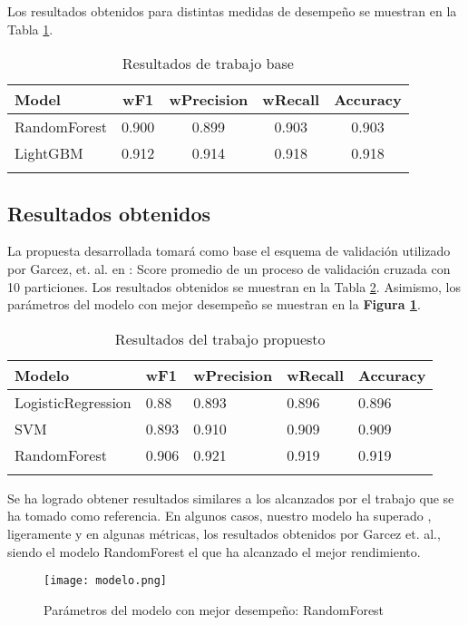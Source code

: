 \documentclass[conference]{IEEEtran}
\begin{document}
Los resultados obtenidos para distintas medidas de desempeño se muestran en la Tabla \ref{tab:base_performance}.

\begin{table}[h!]
\centering
\caption{Resultados de trabajo base}
\label{tab:base_performance}
\begin{tabular}{l|cccc}
\rule{0pt}{3ex}
Model & wF1 & wPrecision & wRecall & Accuracy \\
\hline
\rule{0pt}{3ex}
RandomForest & 0.900 & 0.899 & 0.903 & 0.903 \\
LightGBM & 0.912 & 0.914 & 0.918 & 0.918 \\
\rule{0pt}{3ex}
\end{tabular}
\end{table}

\subsection{\textbf{Resultados obtenidos}}
La propuesta desarrollada tomará como base el esquema de validación utilizado por Garcez, et. al. en \cite{bref}: Score promedio de un proceso de validación cruzada con 10 particiones. Los resultados obtenidos se muestran en la Tabla \ref{tab:resultados_modelos}. Asimismo, los parámetros del modelo con mejor desempeño se muestran en la \textbf{Figura \ref{modelo}}.

\begin{table}[h!]
\centering
\caption{Resultados del trabajo propuesto}
\begin{tabular}{l | llll}
\rule{0pt}{3ex}
Modelo & wF1 & wPrecision & wRecall & Accuracy \\
\hline
\rule{0pt}{3ex}
LogisticRegression & 0.88 & 0.893 & 0.896 & 0.896 \\
SVM & 0.893 & 0.910 & 0.909 & 0.909 \\
RandomForest & 0.906 & 0.921 & 0.919 & 0.919 \\
\rule{0pt}{3ex}
\end{tabular}
\label{tab:resultados_modelos}
\end{table}

Se ha logrado obtener resultados similares a los alcanzados por el trabajo que se ha tomado como referencia. En algunos casos, nuestro modelo ha superado , ligeramente y en algunas métricas, los resultados obtenidos por Garcez et. al., siendo el modelo RandomForest el que ha alcanzado el mejor rendimiento. 

\begin{figure}[htbp!]
  \centering
  \texttt{[image: modelo.png]} 
  \caption{Parámetros del modelo con mejor desempeño: RandomForest}
  \label{modelo}
\end{figure}
\end{document}
